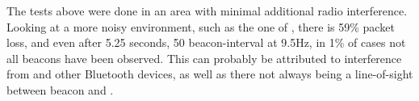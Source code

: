 The tests above were done in an area with minimal additional radio interference.
Looking at a more noisy environment, such as the one of , there is 59\% packet loss, and even after 5.25 seconds, 50 beacon-interval at 9.5Hz, in 1\% of cases not all beacons have been observed.
This can probably be attributed to interference from \wifi and other Bluetooth devices, as well as there not always being a line-of-sight between beacon and \device.

